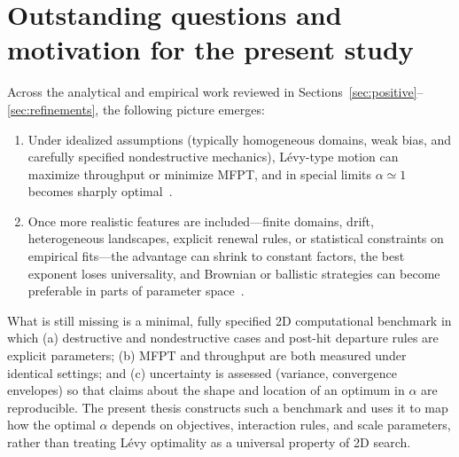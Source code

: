\section{Outstanding questions and motivation for the present study}
\label{sec:gaps}
Across the analytical and empirical work reviewed in Sections~\ref{sec:positive}--\ref{sec:refinements}, the following picture emerges:
\begin{enumerate}
    \item Under idealized assumptions (typically homogeneous domains, weak bias, and carefully specified nondestructive mechanics), Lévy-type motion can maximize throughput or minimize MFPT, and in special limits $\alpha \simeq 1$ becomes sharply optimal~\cite{buldyrev2021comment,raposo2003dynamical,santos2004optimal,viswanathan1999optimizing}.
    \item Once more realistic features are included—finite domains, drift, heterogeneous landscapes, explicit renewal rules, or statistical constraints on empirical fits—the advantage can shrink to constant factors, the best exponent loses universality, and Brownian or ballistic strategies can become preferable in parts of parameter space~\cite{edwards2007revisiting,james2011assessing,levernier2020inverse,palyulin2014levy,plank2008optimal,volpe2017topography}.
\end{enumerate}

What is still missing is a minimal, fully specified 2D computational benchmark in which (a) destructive and nondestructive cases and post-hit departure rules are explicit parameters; (b) MFPT and throughput are both measured under identical settings; and (c) uncertainty is assessed (variance, convergence envelopes) so that claims about the shape and location of an optimum in $\alpha$ are reproducible. The present thesis constructs such a benchmark and uses it to map how the optimal $\alpha$ depends on objectives, interaction rules, and scale parameters, rather than treating Lévy optimality as a universal property of 2D search.
